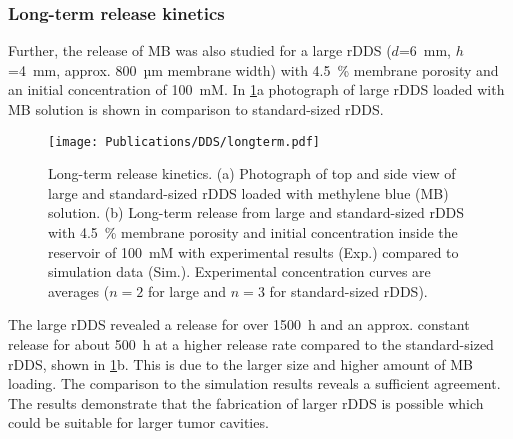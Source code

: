\subsubsection{Long-term release kinetics}
Further, the release of MB was also studied for a large rDDS ($d$=6~mm, $h$=4~mm, approx. 800~µm membrane width) with 4.5~\% membrane porosity and an initial concentration of 100~mM. In \cref{fig:longterm}a photograph of large rDDS loaded with MB solution is shown in comparison to standard-sized rDDS.
\begin{figure}[h!]
  \centering
  \texttt{[image: Publications/DDS/longterm.pdf]}
  \caption{Long-term release kinetics. (a) Photograph of top and side view of large and standard-sized rDDS loaded with methylene blue (MB) solution. (b) Long-term release from large and standard-sized rDDS with 4.5~\% membrane porosity and initial concentration inside the reservoir of 100~mM with experimental results (Exp.) compared to simulation data (Sim.). Experimental concentration curves are averages ($n=2$ for large and $n=3$ for standard-sized rDDS).}
  \label{fig:longterm}
\end{figure}
The large rDDS revealed a release for over 1500~h and an approx. constant release for about 500~h at a higher release rate compared to the standard-sized rDDS, shown in \cref{fig:longterm}b. This is due to the larger size and higher amount of MB loading. The comparison to the simulation results reveals a sufficient agreement. The results demonstrate that the fabrication of larger rDDS is possible which could be suitable for larger tumor cavities.

